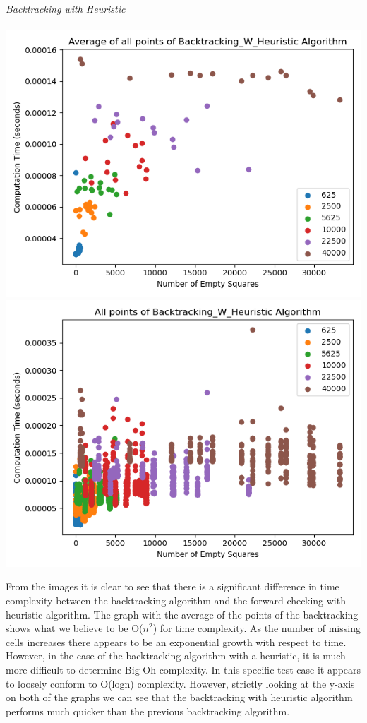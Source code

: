 \documentclass{article}
\begin{document}
\noindent \textit{Backtracking with Heuristic} \\ \\
\includegraphics[scale=0.5]{scatter_avg_Backtracking_w_Heuristic-1.png}
\includegraphics[scale=0.5]{scatter_Backtracking_w_Heuristic-1.png}


From the images it is clear to see that there is a significant difference in
time complexity between the backtracking algorithm and the forward-checking 
with heuristic algorithm. The graph with the average of the points of the
backtracking shows what we believe to be O($n^2$) for time complexity. As the
number of missing cells increases there appears to be an exponential growth
with respect to time. However, in the case of the backtracking algorithm with
a heuristic, it is much more difficult to determine Big-Oh complexity. In this 
specific test case it appears to loosely conform to O(logn) complexity. However,
strictly looking at the y-axis on both of the graphs we can see that the backtracking 
with heuristic algorithm performs much quicker than the previous backtracking algorithm.
\end{document}
